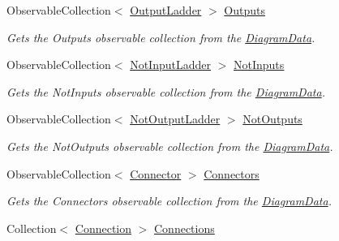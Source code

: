 \begin{DoxyCompactItemize}
Observable\+Collection$<$ \hyperlink{class_prototipo_t_f_g_1_1_output_ladder}{Output\+Ladder} $>$ \hyperlink{class_prototipo_t_f_g_1_1_main_view_model_a4f919cf0de94a255678ff6fde07e39ed}{Outputs}
\begin{DoxyCompactList}\small\item\em Gets the Outputs observable collection from the \hyperlink{class_prototipo_t_f_g_1_1_diagram_data}{Diagram\+Data}. \end{DoxyCompactList}\item 
Observable\+Collection$<$ \hyperlink{class_prototipo_t_f_g_1_1_not_input_ladder}{Not\+Input\+Ladder} $>$ \hyperlink{class_prototipo_t_f_g_1_1_main_view_model_a460dfd479d770d5333148bb2c9f374da}{Not\+Inputs}
\begin{DoxyCompactList}\small\item\em Gets the Not\+Inputs observable collection from the \hyperlink{class_prototipo_t_f_g_1_1_diagram_data}{Diagram\+Data}. \end{DoxyCompactList}\item 
Observable\+Collection$<$ \hyperlink{class_prototipo_t_f_g_1_1_not_output_ladder}{Not\+Output\+Ladder} $>$ \hyperlink{class_prototipo_t_f_g_1_1_main_view_model_a1812ed9ddb30210df70ef3d2a80dfe77}{Not\+Outputs}
\begin{DoxyCompactList}\small\item\em Gets the Not\+Outputs observable collection from the \hyperlink{class_prototipo_t_f_g_1_1_diagram_data}{Diagram\+Data}. \end{DoxyCompactList}\item 
Observable\+Collection$<$ \hyperlink{class_prototipo_t_f_g_1_1_connector}{Connector} $>$ \hyperlink{class_prototipo_t_f_g_1_1_main_view_model_ab1c19d68d9523215515c53fceb005077}{Connectors}
\begin{DoxyCompactList}\small\item\em Gets the Connectors observable collection from the \hyperlink{class_prototipo_t_f_g_1_1_diagram_data}{Diagram\+Data}. \end{DoxyCompactList}\item 
Collection$<$ \hyperlink{class_prototipo_t_f_g_1_1_connection}{Connection} $>$ \hyperlink{class_prototipo_t_f_g_1_1_main_view_model_a6aa57a570df94d6ba318e8d9a30bc96a}{Connections}

\end{DoxyCompactItemize}
